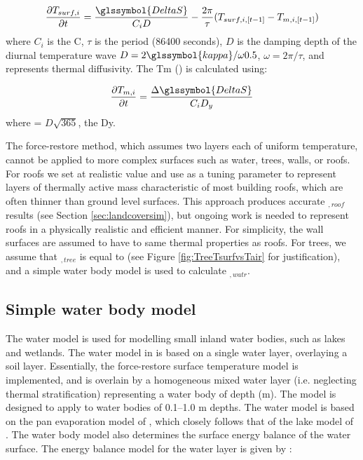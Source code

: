\documentclass[final,3p,times,authoryear]{elsarticle}
\begin{document}
\begin{equation} 
\frac{\partial T_{surf,i}} {\partial t}= \frac{\glssymbol{DeltaS}}{C_{i} D} - \frac{2 \pi}{\tau} (T_{surf,i,[t-1]} - T_{m,i,[t-1]})
\label{eq:force} \end{equation} where $C_{i}$ is the \glsdesc{C}, $\tau$ is the period (86400 seconds), $D$ is the damping depth of the diurnal temperature wave $D = 2 \glssymbol{kappa}  / \omega 0.5$, $\omega = 2\pi / \tau$, and  represents thermal diffusivity.  The \glsdesc{Tm} () is calculated using:


\begin{equation} 
\frac{\partial T_{m,i}}{\partial t} = \frac{\Delta \glssymbol{DeltaS}}{C_{i} D_{y}}
\label{eq:tm} \end{equation} where  = $D \sqrt{365}$, the \glsdesc{Dy}. 

The force-restore method, which assumes two layers each of uniform temperature, cannot be applied to more complex surfaces such as water, trees, walls, or roofs. For  roofs  we set  at realistic value and use  as a tuning parameter to represent layers of thermally active mass characteristic of most building roofs, which are often thinner than ground level surfaces.  This approach produces accurate $_{,roof}$ results (see Section \ref{sec:landcoversim}), but ongoing work is needed to represent roofs in a physically realistic  and  efficient manner. For simplicity, the wall surfaces are assumed to have to same thermal properties as roofs. For trees, we assume that $_{,tree}$ is equal to  (see Figure \ref{fig:TreeTsurfvsTair} for justification), and a simple water body model is used to calculate $_{,watr}$.


\subsection{Simple water body model}\label{sec:simplewater}

The water model is used for modelling small inland water bodies, such as lakes and wetlands. The water model in   is based on a single water layer, overlaying a soil layer. Essentially, the force-restore surface temperature model is implemented, and is overlain by a homogeneous mixed water layer (i.e. neglecting thermal stratification) representing a water body of depth  (m). The model is designed to apply to water bodies of 0.1--1.0 m depths. The water model is based on the pan evaporation model of \cite{MolinaMartinez2006}, which closely follows that of the lake model of \cite{Jacobs1998}. The water body model also determines the surface energy balance of the water surface. The energy balance model for the water layer is given by \cite{MolinaMartinez2006}:
\end{document}
